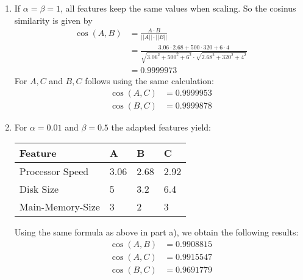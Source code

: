 \begin{enumerate}[label=(\alph*)]
    \item If $\alpha = \beta = 1$, all features keep the same values when scaling. So the cosinus similarity is given by
    \begin{align*}
        \cos(A,B) &= \frac{A \cdot B}{||A|| \cdot ||B||} \\
                &=  \frac{3.06 \cdot 2.68 + 500 \cdot 320 + 6 \cdot 4}{\sqrt{3.06^2 + 500^2 + 6^2} \cdot \sqrt{2.68^2 + 320^2 + 4^2}} \\
                &= 0.9999973
    \end{align*}
    For $A, C$ and $B, C$ follows using the same calculation:
    \begin{align*}
        \cos(A,C) &= 0.9999953 \\
        \cos(B,C) &= 0.9999878
    \end{align*}
    \item For $\alpha = 0.01$ and $\beta = 0.5$ the adapted features yield: 
    \begin{table}[!htb]
        \centering
        \begin{tabular}{llll}
        \hline
        \textbf{Feature} & \textbf{A} & \textbf{B} & \textbf{C} \\ \hline
        Processor Speed  & 3.06       & 2.68       & 2.92       \\
        Disk Size        & 5       & 3.2        & 6.4        \\
        Main-Memory-Size & 3          & 2          & 3          \\ \hline
        \end{tabular}
    \end{table}

    Using the same formula as above in part a), we obtain the following results: 
    \begin{align*}
        \cos(A,B) &= 0.9908815 \\
        \cos(A,C) &= 0.9915547 \\
        \cos(B,C) &= 0.9691779
    \end{align*}


\end{enumerate}
